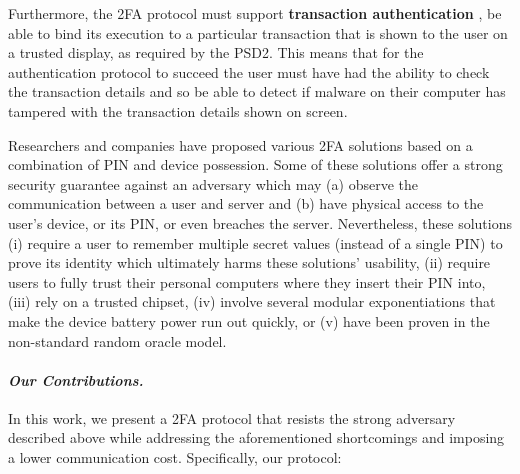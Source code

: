 Furthermore, the 2FA protocol must support \textbf{transaction authentication} \ie, be able to bind its execution to a particular transaction that is shown to the user on a trusted display, as required by the PSD2.
This means that for the authentication protocol to succeed the user must have had the ability to check the transaction details and so be able to detect if malware on their computer has tampered with the transaction details shown on screen.



Researchers and companies have proposed various 2FA solutions based on a combination of PIN and device possession. Some of these solutions offer a strong security guarantee against an adversary which may (a) observe the communication between a user and server and (b) have physical access to the user's device, or its PIN, or even breaches the server. Nevertheless, these solutions (i) require a user to remember multiple secret values (instead of a single PIN)  to prove its identity which ultimately harms these solutions' usability, (ii) require users to fully trust their personal computers where they insert their PIN into, (iii) rely on a trusted chipset, (iv) involve several modular exponentiations that make the device battery power run out quickly, or (v) have been proven in the non-standard random oracle model.







\paragraph{\textbf{\textit{Our Contributions.}}}  In this work, we present a 2FA protocol that resists the strong adversary described above while addressing the aforementioned shortcomings and imposing a lower communication cost. Specifically, our protocol:

